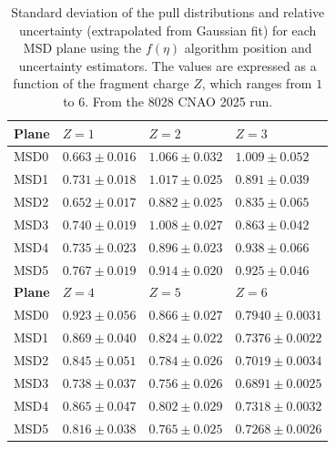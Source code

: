 \begin{table}[H]
	\centering
	\renewcommand{\arraystretch}{1.1}
	{\normalsize%
		\begin{tabular}{M{1.8cm} M{2.8cm} M{2.8cm} M{2.8cm}}
			\hline
			\textbf{Plane} & \textbf{$Z=1$} & \textbf{$Z=2$} & \textbf{$Z=3$} \\
			\hline
			MSD0 & $0.663 \pm 0.016$ & $1.066 \pm 0.032$ & $1.009 \pm 0.052$ \\
			MSD1 & $0.731 \pm 0.018$ & $1.017 \pm 0.025$ & $0.891 \pm 0.039$ \\
			MSD2 & $0.652 \pm 0.017$ & $0.882 \pm 0.025$ & $0.835 \pm 0.065$ \\
			MSD3 & $0.740 \pm 0.019$ & $1.008 \pm 0.027$ & $0.863 \pm 0.042$ \\
			MSD4 & $0.735 \pm 0.023$ & $0.896 \pm 0.023$ & $0.938 \pm 0.066$ \\
			MSD5 & $0.767 \pm 0.019$ & $0.914 \pm 0.020$ & $0.925 \pm 0.046$ \\
			\hline\hline
			\textbf{Plane} & \textbf{$Z=4$} & \textbf{$Z=5$} & \textbf{$Z=6$} \\
			\hline
			MSD0 & $0.923 \pm 0.056$ & $0.866 \pm 0.027$ & $0.7940 \pm 0.0031$ \\
			MSD1 & $0.869 \pm 0.040$ & $0.824 \pm 0.022$ & $0.7376 \pm 0.0022$ \\
			MSD2 & $0.845 \pm 0.051$ & $0.784 \pm 0.026$ & $0.7019 \pm 0.0034$ \\
			MSD3 & $0.738 \pm 0.037$ & $0.756 \pm 0.026$ & $0.6891 \pm 0.0025$ \\
			MSD4 & $0.865 \pm 0.047$ & $0.802 \pm 0.029$ & $0.7318 \pm 0.0032$ \\
			MSD5 & $0.816 \pm 0.038$ & $0.765 \pm 0.025$ & $0.7268 \pm 0.0026$ \\
			\hline
	\end{tabular}}
	\caption[MSD pull widths by fragment charge using the $f(\eta)$ algorithm]{Standard deviation of the pull distributions and relative uncertainty (extrapolated from Gaussian fit) for each MSD plane using the $f(\eta)$ algorithm position and uncertainty estimators. The values are expressed as a function of the fragment charge $Z$, which ranges from $1$ to $6$. From the 8028 CNAO 2025 run.}
	\label{tab:msd_pull_sigmas_feta}
\end{table}
